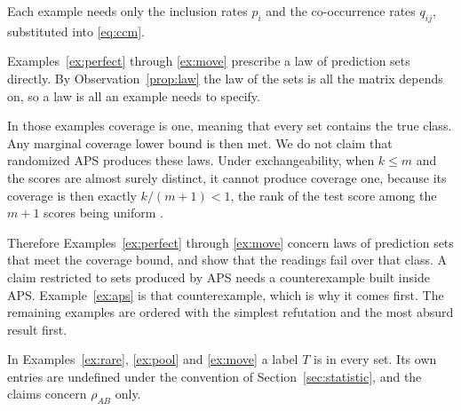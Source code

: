 \documentclass[11pt]{article}
\theoremstyle{definition}
\theoremstyle{definition}
\theoremstyle{remark}
\begin{document}
Each example needs only the inclusion rates $p_i$ and the co-occurrence rates $q_{ij}$, substituted
into \eqref{eq:ccm}.

Examples~\ref{ex:perfect} through \ref{ex:move} prescribe a law of prediction sets directly. By
Observation~\ref{prop:law} the law of the sets is all the matrix depends on, so a law is all an
example needs to specify.

In those examples coverage is one, meaning that every set contains the true class. Any marginal
coverage lower bound is then met. We do not claim that randomized APS produces these laws. Under exchangeability, when $k \le m$ and
the scores are almost surely distinct, it cannot produce coverage one, because its coverage is then
exactly $k/(m+1) < 1$, the rank of the test score among the $m+1$ scores being uniform
\citep{lei2018, romano2020}.

Therefore Examples~\ref{ex:perfect} through \ref{ex:move} concern laws of prediction sets that
meet the coverage bound, and show that the readings fail over that class. A claim restricted to
sets produced by APS needs a counterexample built inside APS. Example~\ref{ex:aps} is that
counterexample, which is why it comes first. The remaining examples are ordered with the simplest refutation and the most absurd result first.

In Examples~\ref{ex:rare}, \ref{ex:pool} and \ref{ex:move} a label $T$ is in every set. Its own entries are
undefined under the convention of Section~\ref{sec:statistic}, and the claims concern
$\rho_{AB}$ only.
\end{document}
